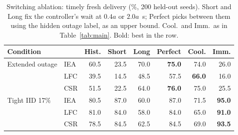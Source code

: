 \begin{table}[t]
\centering
\caption{Switching ablation: timely fresh delivery (\%, 200 held-out seeds). Short and Long fix the controller's wait at $0.4a$ or $2.0a$~s; Perfect picks between them using the hidden outage label, as an upper bound. Cool.\ and Imm.\ as in Table~\ref{tab:main}. Bold: best in the row.}
\label{tab:switch}
\scriptsize
\setlength{\tabcolsep}{3.2pt}
\begin{tabular}{@{}llrrrrrr@{}}\toprule
Condition & & Hist. & Short & Long & Perfect & Cool. & Imm.\\\midrule
Extended outage & IEA & 60.5 & 23.5 & 70.0 & \textbf{75.0} & 74.0 & 26.0\\
 & LFC & 39.5 & 14.5 & 48.5 & 57.5 & \textbf{66.0} & 16.0\\
 & CSR & 51.5 & 22.5 & 64.0 & \textbf{76.0} & 75.0 & 25.5\\
\addlinespace
Tight IID 17\% & IEA & 80.5 & 87.0 & 60.0 & 87.0 & 71.5 & \textbf{95.0}\\
 & LFC & 81.0 & 84.0 & 58.0 & 84.0 & 65.0 & \textbf{91.0}\\
 & CSR & 78.5 & 84.5 & 62.5 & 84.5 & 69.0 & \textbf{93.5}\\\bottomrule
\end{tabular}
\end{table}
